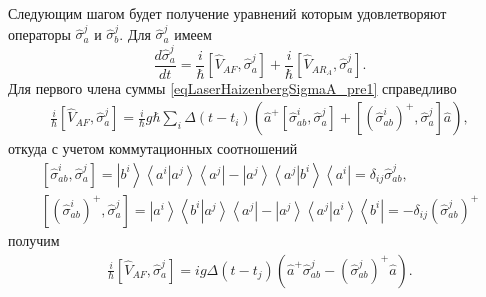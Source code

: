 Следующим шагом будет получение уравнений которым удовлетворяют
операторы $\hat{\sigma}_a^j$ и $\hat{\sigma}_b^j$. Для
$\hat{\sigma}_a^j$ имеем
\begin{equation}
\frac{d \hat{\sigma}_a^j}{d t} = 
\frac{i}{\hbar}
\left[\hat{V}_{AF}, \hat{\sigma}_a^j\right] + 
\frac{i}{\hbar}
\left[\hat{V}_{AR_A}, \hat{\sigma}_a^j\right].
\label{eqLaserHaizenbergSigmaA_pre1}
\end{equation}
Для первого члена суммы \eqref{eqLaserHaizenbergSigmaA_pre1} справедливо
\begin{eqnarray}
\frac{i}{\hbar}
\left[\hat{V}_{AF}, \hat{\sigma}_a^j\right] = 
 \frac{i}{\hbar} g \hbar
\sum_i
\Delta\left(t - t_i\right) 
 \left(
\hat{a}^{+}\left[\hat{\sigma}^{i}_{ab},\hat{\sigma}_a^j\right]  +
\left[\left(\hat{\sigma}^{i}_{ab}\right)^{+},\hat{\sigma}_a^j\right]
\hat{a}
\right),
\nonumber
\end{eqnarray}
откуда с учетом коммутационных соотношений 
\begin{eqnarray}
\left[\hat{\sigma}^{i}_{ab},\hat{\sigma}_a^j\right] = 
\left|b^i\right>\left<a^i\right|\left.a^j\right>\left<a^j\right| -
\left|a^j\right>\left<a^j\right|\left.b^i\right>\left<a^i\right| = 
\delta_{ij}\hat{\sigma}^{j}_{ab},
\nonumber \\
\left[\left(\hat{\sigma}^{i}_{ab}\right)^{+},\hat{\sigma}_a^j\right] = 
\left|a^i\right>\left<b^i\right|\left.a^j\right>\left<a^j\right| -
\left|a^j\right>\left<a^j\right|\left.a^i\right>\left<b^i\right| = 
- \delta_{ij}\left(\hat{\sigma}^{j}_{ab}\right)^{+}
\nonumber
\end{eqnarray}
получим
\begin{eqnarray}
\frac{i}{\hbar}
\left[\hat{V}_{AF}, \hat{\sigma}_a^j\right] = 
i g 
\Delta\left(t - t_j\right) 
 \left(
\hat{a}^{+}\hat{\sigma}^{j}_{ab} -
\left(\hat{\sigma}^{j}_{ab}\right)^{+}\hat{a}
\right).
\label{eqLaserHaizenbergSigmaA_pre1_1}
\end{eqnarray}

